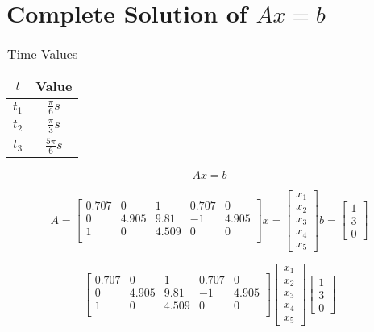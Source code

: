 \section{Complete Solution of $Ax=b$}
\begin{table}[h]
    \centering
    \begin{tabular}{|c|c|}
        \hline
        $t$ & Value \\
        \hline
        $t_1$ & $\frac{\pi}{6}s$ \\
        $t_2$ & $\frac{\pi}{3}s$ \\
        $t_3$ & $\frac{5\pi}{6}s$ \\
        \hline
    \end{tabular}
    \caption{Time Values}
\end{table}

\[Ax=b\]

\[
    A = \begin{bmatrix}
        0.707 & 0 & 1 & 0.707 & 0 \\
        0 & 4.905 & 9.81 & -1 & 4.905 \\
        1 & 0 & 4.509 & 0 & 0 \\
    \end{bmatrix}
%
    x = \begin{bmatrix}
        x_1 \\
        x_2 \\
        x_3 \\
        x_4 \\
        x_5
    \end{bmatrix}
%
    b = \begin{bmatrix}
        1 \\
        3 \\
        0
    \end{bmatrix}
\]

\[
    \begin{bmatrix}
        0.707 & 0 & 1 & 0.707 & 0 \\
        0 & 4.905 & 9.81 & -1 & 4.905 \\
        1 & 0 & 4.509 & 0 & 0 \\
    \end{bmatrix}
%
    \begin{bmatrix}
        x_1 \\
        x_2 \\
        x_3 \\
        x_4 \\
        x_5
    \end{bmatrix}
%
    \begin{bmatrix}
        1 \\
        3 \\
        0
    \end{bmatrix}
\]

